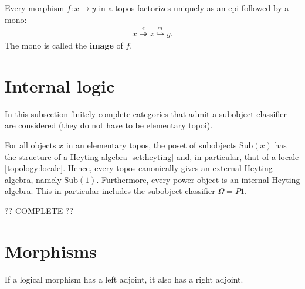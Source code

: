    \begin{property}
        Every morphism $f:x\rightarrow y$ in a topos factorizes uniquely as an epi followed by a mono:
        \begin{gather}
            x\overset{e}{\twoheadrightarrow}z\overset{m}{\hookrightarrow}y.
        \end{gather}
        The mono is called the \textbf{image} of $f$.
    \end{property}

\section{Internal logic}\label{section:internal_logic}

    In this subsection finitely complete categories that admit a subobject classifier are considered (they do not have to be elementary topoi).


    \begin{property}\label{topos:heyting_algebra}
        For all objects $x$ in an elementary topos, the poset of subobjects $\mathrm{Sub}(x)$ has the structure of a Heyting algebra \ref{set:heyting} and, in particular, that of a locale \ref{topology:locale}. Hence, every topos canonically gives an external Heyting algebra, namely $\mathrm{Sub}(1)$. Furthermore, every power object is an internal Heyting algebra. This in particular includes the subobject classifier $\Omega=P1$.
    \end{property}

    ?? COMPLETE ??

\section{Morphisms}


    \begin{property}
        If a logical morphism has a left adjoint, it also has a right adjoint.
    \end{property}

